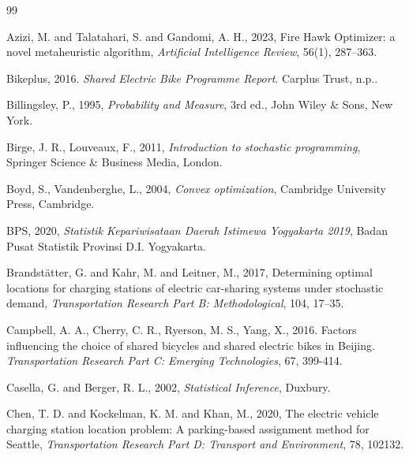 \documentclass{skripsimathugm}
\begin{document}
\begin{thebibliography}{99}

Azizi, M. and Talatahari, S. and Gandomi, A. H., 2023, Fire Hawk Optimizer: a novel metaheuristic algorithm, \emph{Artificial Intelligence Review}, 56(1), 287--363.

Bikeplus, 2016. \emph{Shared Electric Bike Programme Report}. Carplus Trust, n.p..

Billingsley, P., 1995, \emph{Probability and Measure}, 3rd ed., John Wiley \& Sons, New York.

Birge, J. R., Louveaux, F., 2011, \emph{Introduction to stochastic programming}, Springer Science \& Business Media, London.

Boyd, S., Vandenberghe, L., 2004, \emph{Convex optimization}, Cambridge University Press, Cambridge.

BPS, 2020, \emph{Statistik Kepariwisataan Daerah Istimewa Yogyakarta 2019}, Badan Pusat Statistik Provinsi D.I. Yogyakarta.

Brandstätter, G. and Kahr, M. and Leitner, M., 2017, Determining optimal locations for charging stations of electric car-sharing systems under stochastic demand, \emph{Transportation Research Part B: Methodological}, 104, 17--35.

Campbell, A. A., Cherry, C. R., Ryerson, M. S., Yang, X., 2016. Factors influencing the choice of shared bicycles and shared electric bikes in Beijing. \emph{Transportation Research Part C: Emerging Technologies}, 67, 399-414.

Casella, G. and Berger, R. L., 2002, \emph{Statistical Inference}, Duxbury.

Chen, T. D. and Kockelman, K. M. and Khan, M., 2020, The electric vehicle charging station location problem: A parking-based assignment method for Seattle, \emph{Transportation Research Part D: Transport and Environment}, 78, 102132.


\end{thebibliography}
\end{document}
